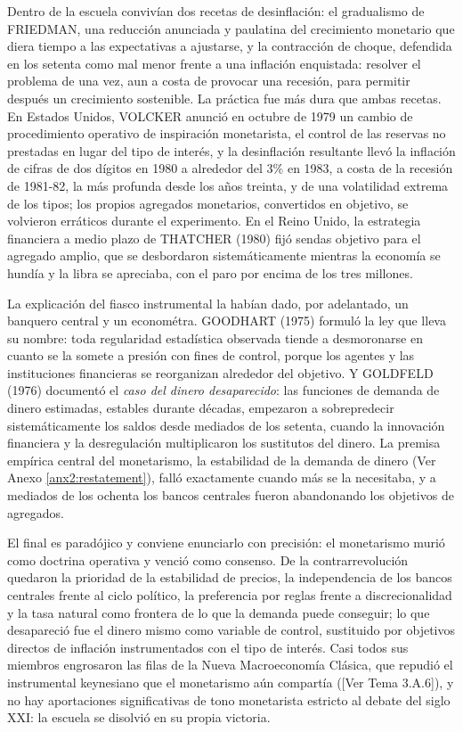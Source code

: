 \documentclass[10pt,a4paper]{article}
\newcommand{\authorfont}[1]{{\fontfamily{EBGaramond-TLF}\selectfont #1}}
\begin{document}
Dentro de la escuela convivían dos recetas de desinflación: el gradualismo de FRIEDMAN, una reducción anunciada y paulatina del crecimiento monetario que diera tiempo a las expectativas a ajustarse, y la contracción de choque, defendida en los setenta como mal menor frente a una inflación enquistada: resolver el problema de una vez, aun a costa de provocar una recesión, para permitir después un crecimiento sostenible. La práctica fue más dura que ambas recetas. En Estados Unidos, VOLCKER anunció en octubre de 1979 un cambio de procedimiento operativo de inspiración monetarista, el control de las reservas no prestadas en lugar del tipo de interés, y la desinflación resultante llevó la inflación de cifras de dos dígitos en 1980 a alrededor del 3\% en 1983, a costa de la recesión de 1981-82, la más profunda desde los años treinta, y de una volatilidad extrema de los tipos; los propios agregados monetarios, convertidos en objetivo, se volvieron erráticos durante el experimento. En el Reino Unido, la estrategia financiera a medio plazo de THATCHER (1980) fijó sendas objetivo para el agregado amplio, que se desbordaron sistemáticamente mientras la economía se hundía y la libra se apreciaba, con el paro por encima de los tres millones.

La explicación del fiasco instrumental la habían dado, por adelantado, un banquero central y un econométra. GOODHART (1975) formuló la ley que lleva su nombre: toda regularidad estadística observada tiende a desmoronarse en cuanto se la somete a presión con fines de control, porque los agentes y las instituciones financieras se reorganizan alrededor del objetivo. Y GOLDFELD (1976) documentó el \textit{caso del dinero desaparecido}: las funciones de demanda de dinero estimadas, estables durante décadas, empezaron a sobrepredecir sistemáticamente los saldos desde mediados de los setenta, cuando la innovación financiera y la desregulación multiplicaron los sustitutos del dinero. La premisa empírica central del monetarismo, la estabilidad de la demanda de dinero (Ver Anexo \ref{anx2:restatement}), falló exactamente cuando más se la necesitaba, y a mediados de los ochenta los bancos centrales fueron abandonando los objetivos de agregados.

El final es paradójico y conviene enunciarlo con precisión: el monetarismo murió como doctrina operativa y venció como consenso. De la contrarrevolución quedaron la prioridad de la estabilidad de precios, la independencia de los bancos centrales frente al ciclo político, la preferencia por reglas frente a discrecionalidad y la tasa natural como frontera de lo que la demanda puede conseguir; lo que desapareció fue el dinero mismo como variable de control, sustituido por objetivos directos de inflación instrumentados con el tipo de interés. Casi todos sus miembros engrosaron las filas de la Nueva Macroeconomía Clásica, que repudió el instrumental keynesiano que el monetarismo aún compartía ([\authorfont{Ver Tema 3.A.6}]), y no hay aportaciones significativas de tono monetarista estricto al debate del siglo XXI: la escuela se disolvió en su propia victoria.
\end{document}
